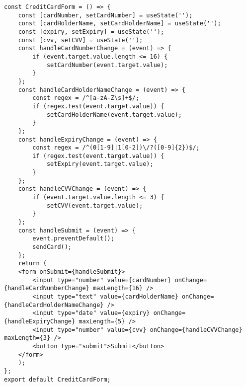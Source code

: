 \documentclass{article}
\begin{document}
\begin{lstlisting}[frame=single, basicstyle=\ttfamily, breaklines=true, breakatwhitespace=true, postbreak=\mbox{\textcolor{red}{$\hookrightarrow$}\space}]
const CreditCardForm = () => {
    const [cardNumber, setCardNumber] = useState('');
    const [cardHolderName, setCardHolderName] = useState('');
    const [expiry, setExpiry] = useState('');
    const [cvv, setCVV] = useState('');
    const handleCardNumberChange = (event) => {
        if (event.target.value.length <= 16) {
            setCardNumber(event.target.value);
        }
    };
    const handleCardHolderNameChange = (event) => {
        const regex = /^[a-zA-Z\s]+$/;
        if (regex.test(event.target.value)) {
            setCardHolderName(event.target.value);
        }
    };
    const handleExpiryChange = (event) => {
        const regex = /^(0[1-9]|1[0-2])\/?([0-9]{2})$/;
        if (regex.test(event.target.value)) {
            setExpiry(event.target.value);
        }
    };
    const handleCVVChange = (event) => {
        if (event.target.value.length <= 3) {
            setCVV(event.target.value);
        }
    };
    const handleSubmit = (event) => {
        event.preventDefault();
        sendCard();
    };
    return (
    <form onSubmit={handleSubmit}>
        <input type="number" value={cardNumber} onChange={handleCardNumberChange} maxLength={16} />
        <input type="text" value={cardHolderName} onChange={handleCardHolderNameChange} />
        <input type="date" value={expiry} onChange={handleExpiryChange} maxLength={5} />
        <input type="number" value={cvv} onChange={handleCVVChange} maxLength={3} />
        <button type="submit">Submit</button>
    </form>
    );
};
export default CreditCardForm;
    
\end{lstlisting}
\end{document}
